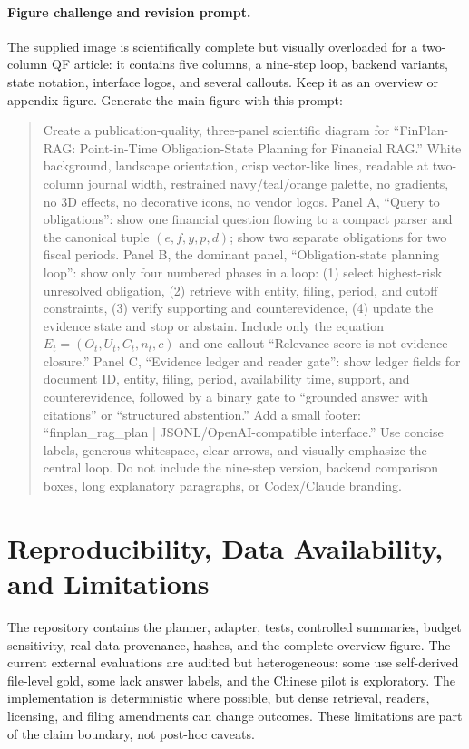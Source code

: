 \documentclass[12pt]{article}
\begin{document}
\paragraph{Figure challenge and revision prompt.} The supplied image is scientifically complete but visually overloaded for a two-column QF article: it contains five columns, a nine-step loop, backend variants, state notation, interface logos, and several callouts. Keep it as an overview or appendix figure. Generate the main figure with this prompt:

\begin{quote}\small
Create a publication-quality, three-panel scientific diagram for ``FinPlan-RAG: Point-in-Time Obligation-State Planning for Financial RAG.'' White background, landscape orientation, crisp vector-like lines, readable at two-column journal width, restrained navy/teal/orange palette, no gradients, no 3D effects, no decorative icons, no vendor logos. Panel A, ``Query to obligations'': show one financial question flowing to a compact parser and the canonical tuple $(e,f,y,p,d)$; show two separate obligations for two fiscal periods. Panel B, the dominant panel, ``Obligation-state planning loop'': show only four numbered phases in a loop: (1) select highest-risk unresolved obligation, (2) retrieve with entity, filing, period, and cutoff constraints, (3) verify supporting and counterevidence, (4) update the evidence state and stop or abstain. Include only the equation $E_t=(O_t,U_t,C_t,n_t,c)$ and one callout ``Relevance score is not evidence closure.'' Panel C, ``Evidence ledger and reader gate'': show ledger fields for document ID, entity, filing, period, availability time, support, and counterevidence, followed by a binary gate to ``grounded answer with citations'' or ``structured abstention.'' Add a small footer: ``finplan\_rag\_plan | JSONL/OpenAI-compatible interface.'' Use concise labels, generous whitespace, clear arrows, and visually emphasize the central loop. Do not include the nine-step version, backend comparison boxes, long explanatory paragraphs, or Codex/Claude branding.
\end{quote}

\section{Reproducibility, Data Availability, and Limitations}
The repository contains the planner, adapter, tests, controlled summaries, budget sensitivity, real-data provenance, hashes, and the complete overview figure. The current external evaluations are audited but heterogeneous: some use self-derived file-level gold, some lack answer labels, and the Chinese pilot is exploratory. The implementation is deterministic where possible, but dense retrieval, readers, licensing, and filing amendments can change outcomes. These limitations are part of the claim boundary, not post-hoc caveats.
\end{document}
